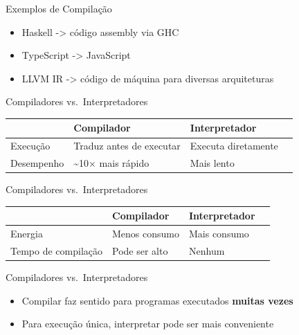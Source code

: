 \begin{frame}{Exemplos de Compilação}

    \begin{itemize}

        \item
        Haskell -> código assembly via GHC
        \item
        TypeScript -> JavaScript
        \item
        LLVM IR -> código de máquina para diversas arquiteturas
    \end{itemize}
\end{frame}

\begin{frame}{Compiladores vs.~Interpretadores}

    \begin{table}
        \begin{tabular}{l l l l}
            \hline
            & Compilador & Interpretador \\
            \hline
            Execução & Traduz antes de executar & Executa diretamente \\
            Desempenho & \textasciitilde10× mais rápido & Mais lento \\
            \hline
        \end{tabular}
    \end{table}
\end{frame}

\begin{frame}{Compiladores vs.~Interpretadores}

    \begin{table}
        \begin{tabular}{l l l l}
            \hline
            & Compilador & Interpretador \\
            \hline
            Energia & Menos consumo & Mais consumo \\
            Tempo de compilação & Pode ser alto & Nenhum \\
            \hline
        \end{tabular}
    \end{table}
\end{frame}

\begin{frame}{Compiladores vs.~Interpretadores}

    \begin{itemize}

        \item
        Compilar faz sentido para programas executados \textbf{muitas vezes}
        \item
        Para execução única, interpretar pode ser mais conveniente
    \end{itemize}
\end{frame}

